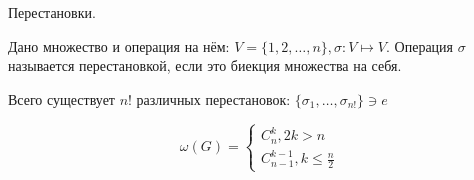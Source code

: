 \begin{rem} Перестановки.

Дано множество и операция на нём: $V = \{1,2, \dots, n\} , \sigma : V \mapsto V$. Операция $\sigma$ называется перестановкой, если это биекция множества на себя.

Всего существует $n!$ различных перестановок: $\{\sigma_1, \dots, \sigma_{n!} \} \ni e$
 
 \end{rem}
 
 
\begin{erdesh} 
 
\[ \omega(G) = \begin{cases}
C^k_n, 2k > n\\
C^{k-1}_{n-1}, k \leq \frac n 2 
\end{cases}\]

 
\end{erdesh}
\newcommand{\fset}{\mathbb{F}}
